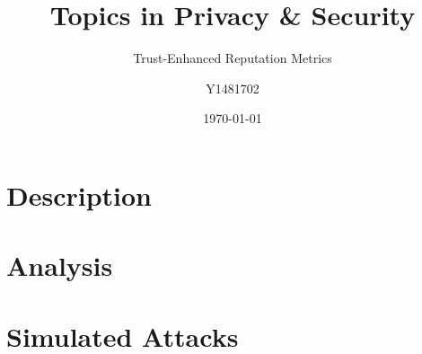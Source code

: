 \documentclass{article}
\title{Topics in Privacy \& Security}
\subtitle{Trust-Enhanced Reputation Metrics}
\author{Y1481702}
\date{\today}
\begin{document}
\begin{titlepage}
\maketitle
\tableofcontents
\end{titlepage}


\section{Description} %

\section{Analysis} %


\section{Simulated Attacks} %

\end{document}
